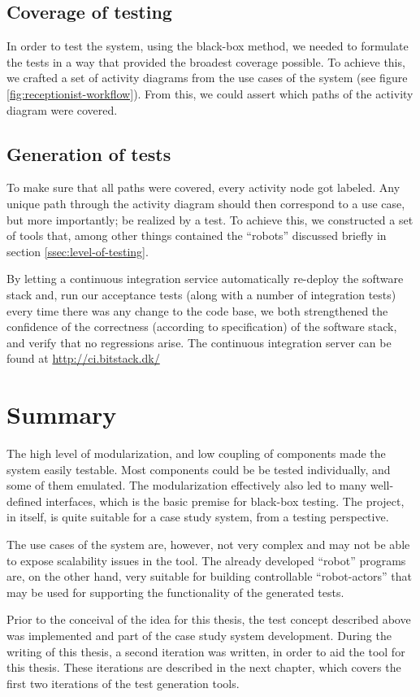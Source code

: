 \subsection{Coverage of testing}
In order to test the system, using the black-box method, we needed to formulate the tests in a way that provided the broadest coverage possible. To achieve this, we crafted a set of activity diagrams from the use cases of the system (see figure \ref{fig:receptionist-workflow}). From this, we could assert which paths of the activity diagram were covered.

\subsection{Generation of tests}
To make sure that all paths were covered, every activity node got labeled. Any unique path through the activity diagram should then correspond to a use case, but more importantly; be realized by a test. To achieve this, we constructed a set of tools that, among other things contained the ``robots'' discussed briefly in section \ref{ssec:level-of-testing}.\medskip

\noindent By letting a continuous integration service automatically re-deploy the software stack and, run our acceptance tests (along with a number of integration tests) every time there was any change to the code base, we both strengthened the confidence of the correctness (according to specification) of the software stack, and verify that no regressions arise. The continuous integration server can be found at \url{http://ci.bitstack.dk/}

\section{Summary}
The high level of modularization, and low coupling of components made the system easily testable. Most components could be be tested individually, and some of them emulated. The modularization effectively also led to many well-defined interfaces, which is the basic premise for black-box testing. The project, in itself, is quite suitable for a case study system, from a testing perspective.\medskip

\noindent The use cases of the system are, however, not very complex and may not be able to expose scalability issues in the tool. The already developed ``robot'' programs are, on the other hand, very suitable for building controllable ``robot-actors'' that may be used for supporting the functionality of the generated tests.\medskip

\noindent Prior to the conceival of the idea for this thesis, the test concept described above was implemented and part of the case study system development. During the writing of this thesis, a second iteration was written, in order to aid the tool for this thesis. These iterations are described in the next chapter, which covers the first two iterations of the test generation tools.